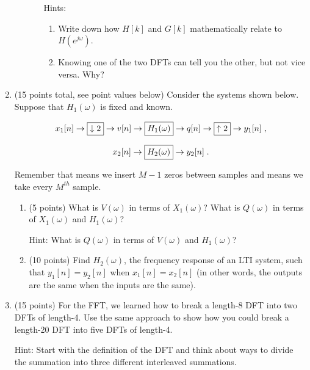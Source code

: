 \documentclass[]{siamltex}
\begin{document}
\begin{enumerate}
\begin{enumerate}
\begin{enumerate}
		Hints: 
			\begin{enumerate}
			\item Write down how $H[k]$ and $G[k]$ mathematically relate to $H(e^{j\omega})$. 
			\item Knowing one of the two DFTs can tell you the other, but not vice versa. Why?
			\end{enumerate}
		\end{enumerate}
	\end{enumerate}



\newpage
\item (15 points total, see point values below) Consider the systems shown below. Suppose that $H_1(\omega)$ is fixed and known. 

$$x_1[n] \rightarrow \fbox{$\downarrow 2$} \rightarrow v[n]  \rightarrow \fbox{$H_1(\omega)$}  \rightarrow q[n]\rightarrow \fbox{$\uparrow 2$} \rightarrow y_1[n]\;,$$

$$x_2[n] \rightarrow \fbox{$H_2(\omega)$} \rightarrow y_2[n]\;.$$

\vspace{3mm} Remember that  means we insert $M-1$ zeros between samples and  means we take every $M^{th}$ sample.

\vspace{3mm} 
	\begin{enumerate}
	\item (5 points) What is $V(\omega)$ in terms of $X_1(\omega)$? What is $Q(\omega)$ in terms of $X_1(\omega)$ and $H_1(\omega)$?
	
	Hint: What is $Q(\omega)$ in terms of $V(\omega)$ and $H_1(\omega)$?
	
	\vspace{2cm} \item (10 points) Find $H_2(\omega)$, the frequency response of an LTI system, such that $y_1[n] = y_2[n]$ when $x_1[n] = x_2[n]$ (in other words, the outputs are the same when the inputs are the same).
	
	\end{enumerate}



\newpage
\item (15 points) For the FFT, we learned how to break a length-8 DFT into two DFTs of length-4. Use the same approach to show how you could break a length-20 DFT into five DFTs of length-4. 

Hint: Start with the definition of the DFT and think about ways to divide the summation into three different interleaved summations.







\end{enumerate}
\end{document}
